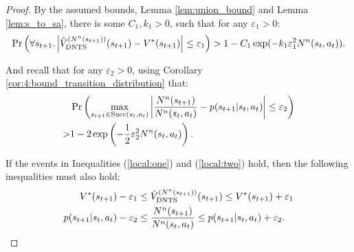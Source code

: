     \begin{proof}
        By the assumed bounds, Lemma \ref{lem:union_bound} and Lemma \ref{lem:s_to_sa}, there is some $C_1,k_1>0$, such that for any $\varepsilon_1 >0$:
        \begin{align}
            \Pr\left(\forall s_{t+1}. \left|{\hat{V}^{(N^n(s_{t+1}))}_{{\textnormal{DNTS}}}}(s_{t+1})-V^*(s_{t+1}) \right| \leq \varepsilon_1 \right) > 1-C_1\exp(-k_1\varepsilon_1^2 N^n(s_t,a_t)). \label{local:one}
        \end{align}

        And recall that for any $\varepsilon_2>0$, using Corollary \ref{cor:4:bound_transition_distribution} that:
        \begin{align}
            & \Pr\left(\max_{s_{t+1}\in{\textnormal{Succ}(s_t,a_t)}} 
                \left| \frac{N^n(s_{t+1})}{N^n(s_t,a_t)} - p(s_{t+1}|s_t,a_t) \right| 
                \leq \varepsilon_2 \right) \nonumber \\
                    > & 1 - 2 \exp\left(-\frac{1}{2}\varepsilon_2^2 N^n(s_t,a_t) \right). \label{local:two}
        \end{align}
        
        If the events in Inequalities (\ref{local:one}) and (\ref{local:two}) hold, then the following inequalities must also hold:
        \begin{align}
            V^*(s_{t+1})- \varepsilon_1
                &\leq {\hat{V}^{(N^n(s_{t+1}))}_{{\textnormal{DNTS}}}}(s_{t+1})
                \leq V^*(s_{t+1})+ \varepsilon_1 \\
            p(s_{t+1}|s_t,a_t) - \varepsilon_2 
                &\leq \frac{N^n(s_{t+1})}{N^n(s_t,a_t)} 
                \leq p(s_{t+1}|s_t,a_t) + \varepsilon_2.
        \end{align} 
        

\end{proof}
